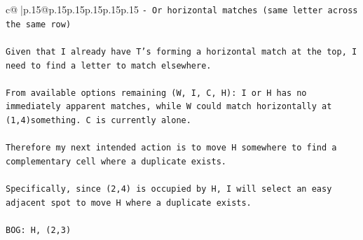 \documentclass{article}
\begin{document}
{\begin{supertabular}{c@{$\;$}|p{.15\linewidth}@{}p{.15\linewidth}p{.15\linewidth}p{.15\linewidth}p{.15\linewidth}p{.15\linewidth}}
{{{\texttt{{-} Or horizontal matches (same letter across the same row)} \\
\\ 
\texttt{Given that I already have T's forming a horizontal match at the top, I need to find a letter to match elsewhere.} \\
\\ 
\texttt{From available options remaining (W, I, C, H): I or H has no immediately apparent matches, while W could match horizontally at (1,4)something. C is currently alone.} \\
\\ 
\texttt{Therefore my next intended action is to move H somewhere to find a complementary cell where a duplicate exists.} \\
\\ 
\texttt{Specifically, since (2,4) is occupied by H, I will select an easy adjacent spot to move H where a duplicate exists.} \\
\\ 
\texttt{BOG: H, (2,3)} \\
            }
        }
    }
     \\ \\


\end{supertabular}}
\end{document}
